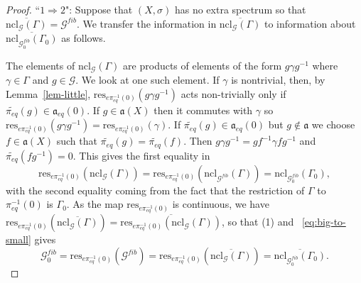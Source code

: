 \documentclass[12pt]{amsart}
\theoremstyle{definition}
\numberwithin{equation}{section}
\newcommand{\Gg}{{\mathcal G}}
\newcommand{\aut}{{\mathfrak a}}
\newcommand{\aute}{\aut_{eq}}
\newcommand{\pe}{\pi_{eq}}
\newcommand{\tpe}{\widetilde{\pe}}
\newcommand{\res}{\mathrm{res}}
\begin{document}
\begin{proof}
``$1 \Rightarrow 2$":
Suppose that $(X,\sigma)$ has no  extra spectrum so that  $\overline{\text{ncl}_{\Gg}(\Gamma)}=\Gg^{fib}$.  We transfer the information in $\overline{\text{ncl}_{\Gg}(\Gamma)}$ to information about  $\overline{\text{ncl}_{\Gg^{fib}_0}(\Gamma_0)} $ as follows.

 
    The elements of $\text{ncl}_{\Gg}(\Gamma)$ are products of elements of the form $g \gamma g^{-1}$ where $\gamma\in \Gamma$ and $g\in\Gg$. We look at one such element. If $\gamma$ is nontrivial, then, by Lemma~\ref{lem-little},
    $\res_{e\pe^{-1}(0) }(g \gamma g^{-1})$ acts non-trivially only if $\tpe(g)\in \aute(0)$.  If $g \in \aut(X)$ then it commutes with $\gamma$ so $  \res_{e\pe^{-1}(0) }(g \gamma g^{-1}) = \res_{e\pe^{-1}(0) }( \gamma )$. If $\tpe(g)\in \aute(0)$ but 
 $g\notin\aut$ we choose $f\in\aut(X)$ such that $\tpe(g)=\tpe(f)$. Then  $g \gamma g^{-1} = g  f ^{-1}\gamma f g^{-1}$ and $\tpe(fg^{-1})=0$. This gives the first equality in
    \begin{equation}\label{eq:big-to-small}\res_{e\pe^{-1}(0) }(\text{ncl}_{\Gg}(\Gamma))=\res_{e\pe^{-1}(0) }(      \text{ncl}_{\Gg^{fib}}(\Gamma)                     )=             \text{ncl}_{\Gg^{fib}_0}(\Gamma_0)       ,\end{equation} with the second equality coming from the fact that the restriction of $\Gamma$ to $\pe^{-1}(0)$  is $\Gamma_0$.
     As the map $\res_{e\pe^{-1}(0) }$ is continuous, we have $\res_{e\pe^{-1}(0) }(\overline{\text{ncl}_{\Gg}(\Gamma)})= \overline{\res_{e\pe^{-1}(0) }(\text{ncl}_{\Gg}(\Gamma))}$, so that (1) 
 and ~\eqref{eq:big-to-small} gives
    $$ \Gg^{fib}_0 = \res_{e\pe^{-1}(0) }(   \Gg^{fib}      )= \res_{e\pe^{-1}(0) }(\overline{\text{ncl}_{\Gg}(\Gamma)})=    \overline{ \text{ncl}_{\Gg^{fib}_0}(\Gamma_0)}.$$  
        
       


\end{proof}
\end{document}
